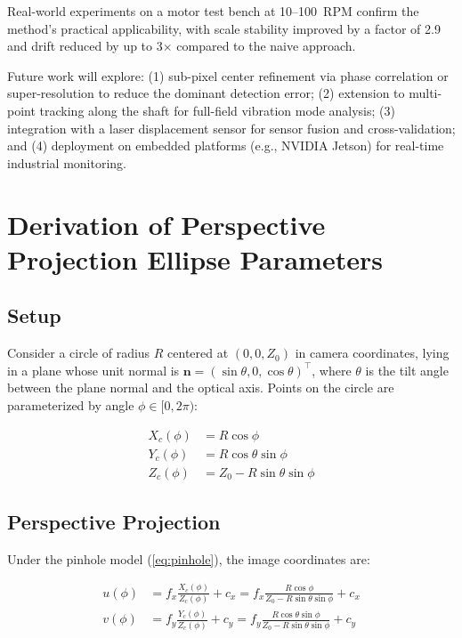 \documentclass[journal]{IEEEtran}
\begin{document}
Real-world experiments on a motor test bench at 10--100~RPM confirm the
method's practical applicability, with scale stability improved by a factor
of 2.9 and drift reduced by up to 3$\times$ compared to the naive approach.

Future work will explore: (1) sub-pixel center refinement via phase correlation
or super-resolution to reduce the dominant detection error; (2) extension to
multi-point tracking along the shaft for full-field vibration mode analysis;
(3) integration with a laser displacement sensor for sensor fusion and
cross-validation; and (4) deployment on embedded platforms (e.g., NVIDIA Jetson)
for real-time industrial monitoring.

\appendices

\section{Derivation of Perspective Projection Ellipse Parameters}

\subsection*{Setup}

Consider a circle of radius $R$ centered at $(0,0,Z_0)$ in camera coordinates,
lying in a plane whose unit normal is $\mathbf{n} = (\sin\theta, 0, \cos\theta)^{\top}$,
where $\theta$ is the tilt angle between the plane normal and the optical axis.
Points on the circle are parameterized by angle $\phi \in [0, 2\pi)$:

\begin{align}
X_c(\phi) &= R \cos\phi \label{eq:ap_X} \\
Y_c(\phi) &= R \cos\theta \sin\phi \label{eq:ap_Y} \\
Z_c(\phi) &= Z_0 - R \sin\theta \sin\phi \label{eq:ap_Z}
\end{align}

\subsection*{Perspective Projection}

Under the pinhole model (\ref{eq:pinhole}), the image coordinates are:

\begin{align}
u(\phi) &= f_x \frac{X_c(\phi)}{Z_c(\phi)} + c_x
        = f_x \frac{R \cos\phi}{Z_0 - R \sin\theta \sin\phi} + c_x
        \label{eq:ap_u} \\
v(\phi) &= f_y \frac{Y_c(\phi)}{Z_c(\phi)} + c_y
        = f_y \frac{R \cos\theta \sin\phi}{Z_0 - R \sin\theta \sin\phi} + c_y
        \label{eq:ap_v}
\end{align}
\end{document}
